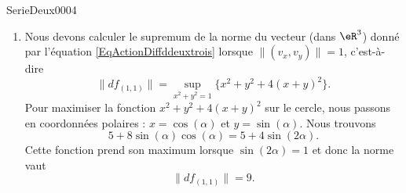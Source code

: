 \begin{corrige}{SerieDeux0004}
\begin{enumerate}
		\item
			Nous devons calculer le supremum de la norme du vecteur (dans $\eR^3$) donné par l'équation \eqref{EqActionDiffddeuxtrois} lorsque $\| (v_x,v_y) \|=1$, c'est-à-dire
			\begin{equation}
				\| df_{(1,1)} \|=\sup_{x^2+y^2=1}\{ x^2+y^2+4(x+y)^2 \}.
			\end{equation}
			Pour maximiser la fonction $x^2+y^2+4(x+y)^2$ sur le cercle, nous passons en coordonnées polaires : $x=\cos(\alpha)$ et $y=\sin(\alpha)$. Nous trouvons
			\begin{equation}
				5+8\sin(\alpha)\cos(\alpha)=5+4\sin(2\alpha).
			\end{equation}
			Cette fonction prend son maximum lorsque $\sin(2\alpha)=1$ et donc la norme vaut
			\begin{equation}
				\| df_{(1,1)} \|=9.
			\end{equation}

	\end{enumerate}

\end{corrige}
